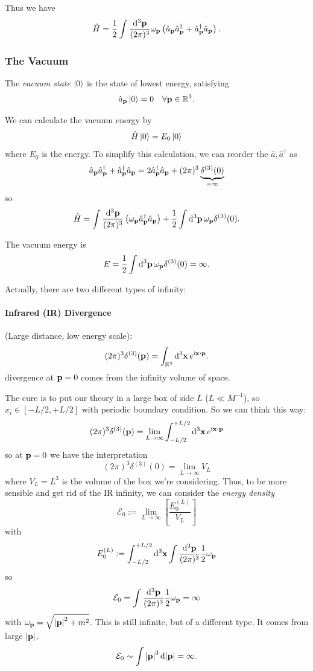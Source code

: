 \documentclass[a4paper,11pt]{article}
\begin{document}
	Thus we have
	\begin{equation}
		\hat H = \frac{1}{2} \int \frac{\dd[3]{\vb p}}{(2\pi)^{3}} \omega _{\vb p} \left( \hat a _{\vb p}\hat a^\dagger _{\vb p} + \hat a^\dagger _{\vb p} \hat a _{\vb p} \right).
		\label{eq:2.3.5}
	\end{equation}
	
	\subsubsection{The Vacuum}
	
	\begin{defi}
		The \emph{vacuum state} $\ket{0}$ is the state of lowest energy, satisfying 
		\[
			\hat a _{\vb p} \ket{0} = 0 \quad \forall \vb p \in \mathbb{R}^3.
		\]
	\end{defi}

	We can calculate the vacuum energy by
	\[
		\hat H \ket{0} = E_0 \ket{0}
	\]
	where $E_0$ is the energy. To simplify this calculation, we can reorder the $\hat a, \hat a^\dagger$ as 
	\[
		\hat a _{\vb p}\hat a^\dagger _{\vb p} + \hat a^\dagger _{\vb p} \hat a _{\vb p} = 2 \hat a^\dagger _{\vb p} \hat a _{\vb p} + (2 \pi)^3 \underbrace{\delta ^{(3)}(0)}_{= \infty}
	\]
	so
	\[
		\hat H = \int \frac{\dd[3]{\vb p}}{(2\pi)^{3}} \left( \omega _{\vb p} \hat a^\dagger _{\vb p} \hat a _{\vb p} \right) + \frac{1}{2} \int \dd[3]{\vb p} \omega _{\vb p} \delta ^{(3)}(0).
	\]
	
	The vacuum energy is 
	\[
		E = \frac{1}{2} \int \dd[3]{\vb p} \omega _{\vb p} \delta ^{(3)}(0) = \infty.
	\]
	
	Actually, there are two different types of infinity:
	\paragraph{Infrared (IR) Divergence} (Large distance, low energy scale): \[
		(2 \pi)^3 \delta ^{(3)}(\vb p) = \int _{\mathbb{R}^3} \dd[3]{\vb x} e ^{\mathrm{i} \vb x \vdot \vb p}.
	\]
	divergence at $\vb p = 0$ comes from the infinity volume of space. 
	
	The cure is to put our theory in a large box of side $L$ ($L \ll M^{-1}$), so $x_i \in [-L/2,+L/2]$ with periodic boundary condition. So we can think this way:
	\[
		(2 \pi)^3 \delta ^{(3)}(\vb p) = \lim _{L \to \infty} \int_{-L/2}^{+L/2} \dd[3]{\vb x} e ^{\mathrm{i} \vb x \vdot \vb p}
	\]
	so at $\vb p = 0$ we have the interpretation
	\[
		(2 \pi)^3 \delta ^{(3)}(0) = \lim _{L \to \infty} V_L
	\]
	where $V_L = L^3$ is the volume of the box we're considering. Thus, to be more sensible and get rid of the IR infinity, we can consider the \emph{energy density}
	\[
		\mathcal{E}_0 := \lim _{L \to \infty} \left[ \frac{E_0 ^{(L)}}{V_L} \right]
	\]
	with
	\[
		E_0 ^{(L)} := \int_{-L/2}^{+L/2} \dd[3]{\vb x} \int \frac{\dd[3]{\vb p}}{(2\pi)^{3}} \frac{1}{2} \omega _{\vb p}
	\]
	so
	\[
		\mathcal{E}_0 = \int \frac{\dd[3]{\vb p}}{(2\pi)^{3}} \frac{1}{2} \omega _{\vb p} = \infty
	\]
	with $\omega _{\vb p} = \sqrt{\abs{\vb p}^2 + m^2}$. This is still infinite, but of a different type. It comes from large $\abs{\vb p}$. \[
		\mathcal{E}_0 \sim \int \abs{\vb p}^3 \dd{\abs{\vb p}} = \infty.
	\]
\end{document}
